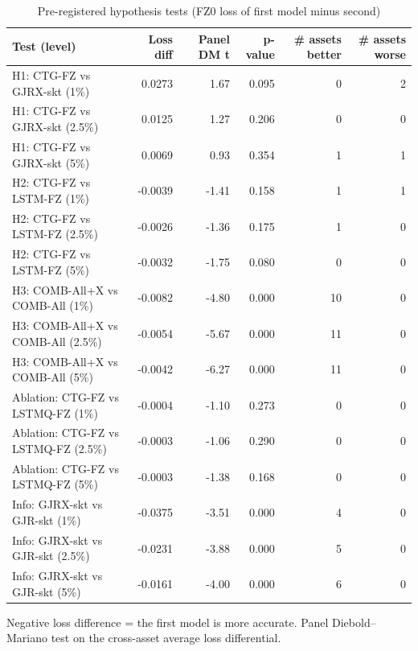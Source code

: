 \begin{table}[htbp]
\centering
\footnotesize
\caption{Pre-registered hypothesis tests (FZ0 loss of first model minus second)}
\label{tab:hyp}
\begin{tabular}{lrrrrr}
\toprule
Test (level) & Loss diff & Panel DM t & p-value & \# assets better & \# assets worse \\
\midrule
H1: CTG-FZ vs GJRX-skt (1\%) & 0.0273 & 1.67 & 0.095 & 0 & 2 \\
H1: CTG-FZ vs GJRX-skt (2.5\%) & 0.0125 & 1.27 & 0.206 & 0 & 0 \\
H1: CTG-FZ vs GJRX-skt (5\%) & 0.0069 & 0.93 & 0.354 & 1 & 1 \\
H2: CTG-FZ vs LSTM-FZ (1\%) & -0.0039 & -1.41 & 0.158 & 1 & 1 \\
H2: CTG-FZ vs LSTM-FZ (2.5\%) & -0.0026 & -1.36 & 0.175 & 1 & 0 \\
H2: CTG-FZ vs LSTM-FZ (5\%) & -0.0032 & -1.75 & 0.080 & 0 & 0 \\
H3: COMB-All+X vs COMB-All (1\%) & -0.0082 & -4.80 & 0.000 & 10 & 0 \\
H3: COMB-All+X vs COMB-All (2.5\%) & -0.0054 & -5.67 & 0.000 & 11 & 0 \\
H3: COMB-All+X vs COMB-All (5\%) & -0.0042 & -6.27 & 0.000 & 11 & 0 \\
Ablation: CTG-FZ vs LSTMQ-FZ (1\%) & -0.0004 & -1.10 & 0.273 & 0 & 0 \\
Ablation: CTG-FZ vs LSTMQ-FZ (2.5\%) & -0.0003 & -1.06 & 0.290 & 0 & 0 \\
Ablation: CTG-FZ vs LSTMQ-FZ (5\%) & -0.0003 & -1.38 & 0.168 & 0 & 0 \\
Info: GJRX-skt vs GJR-skt (1\%) & -0.0375 & -3.51 & 0.000 & 4 & 0 \\
Info: GJRX-skt vs GJR-skt (2.5\%) & -0.0231 & -3.88 & 0.000 & 5 & 0 \\
Info: GJRX-skt vs GJR-skt (5\%) & -0.0161 & -4.00 & 0.000 & 6 & 0 \\
\bottomrule
\end{tabular}
\par\smallskip\parbox{\linewidth}{\scriptsize Negative loss difference = the first model is more accurate. Panel Diebold--Mariano test on the cross-asset average loss differential.}
\end{table}